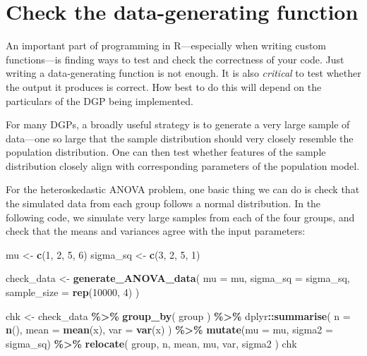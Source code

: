 \documentclass[
]{book}
\newenvironment{Shaded}{\begin{snugshade}}{\end{snugshade}}
\newcommand{\AttributeTok}[1]{\textcolor[rgb]{0.13,0.29,0.53}{#1}}
\newcommand{\DecValTok}[1]{\textcolor[rgb]{0.00,0.00,0.81}{#1}}
\newcommand{\FunctionTok}[1]{\textcolor[rgb]{0.13,0.29,0.53}{\textbf{#1}}}
\newcommand{\NormalTok}[1]{#1}
\newcommand{\OtherTok}[1]{\textcolor[rgb]{0.56,0.35,0.01}{#1}}
\newcommand{\SpecialCharTok}[1]{\textcolor[rgb]{0.81,0.36,0.00}{\textbf{#1}}}
\begin{document}
\section{Check the data-generating function}\label{check-the-data-generating-function}

An important part of programming in R---especially when writing custom functions---is finding ways to test and check the correctness of your code. Just writing a data-generating function is not enough. It is also \emph{critical} to test whether the output it produces is correct. How best to do this will depend on the particulars of the DGP being implemented.

For many DGPs, a broadly useful strategy is to generate a very large sample of data---one so large that the sample distribution should very closely resemble the population distribution.
One can then test whether features of the sample distribution closely align with corresponding parameters of the population model.

For the heteroskedastic ANOVA problem, one basic thing we can do is check that the simulated data from each group follows a normal distribution.
In the following code, we simulate very large samples from each of the four groups, and check that the means and variances agree with the input parameters:

\begin{Shaded}
\begin{Highlighting}[]
\NormalTok{mu }\OtherTok{\textless{}{-}} \FunctionTok{c}\NormalTok{(}\DecValTok{1}\NormalTok{, }\DecValTok{2}\NormalTok{, }\DecValTok{5}\NormalTok{, }\DecValTok{6}\NormalTok{)}
\NormalTok{sigma\_sq }\OtherTok{\textless{}{-}} \FunctionTok{c}\NormalTok{(}\DecValTok{3}\NormalTok{, }\DecValTok{2}\NormalTok{, }\DecValTok{5}\NormalTok{, }\DecValTok{1}\NormalTok{)}

\NormalTok{check\_data }\OtherTok{\textless{}{-}} \FunctionTok{generate\_ANOVA\_data}\NormalTok{( }
  \AttributeTok{mu =}\NormalTok{ mu, }
  \AttributeTok{sigma\_sq =}\NormalTok{ sigma\_sq,}
  \AttributeTok{sample\_size =} \FunctionTok{rep}\NormalTok{(}\DecValTok{10000}\NormalTok{, }\DecValTok{4}\NormalTok{) }
\NormalTok{)}

\NormalTok{chk }\OtherTok{\textless{}{-}} 
\NormalTok{  check\_data }\SpecialCharTok{\%\textgreater{}\%} 
  \FunctionTok{group\_by}\NormalTok{( group ) }\SpecialCharTok{\%\textgreater{}\%}
\NormalTok{  dplyr}\SpecialCharTok{::}\FunctionTok{summarise}\NormalTok{(}
    \AttributeTok{n =} \FunctionTok{n}\NormalTok{(),}
    \AttributeTok{mean =} \FunctionTok{mean}\NormalTok{(x),}
    \AttributeTok{var =} \FunctionTok{var}\NormalTok{(x)}
\NormalTok{  ) }\SpecialCharTok{\%\textgreater{}\%}
  \FunctionTok{mutate}\NormalTok{(}\AttributeTok{mu =}\NormalTok{ mu, }\AttributeTok{sigma2 =}\NormalTok{ sigma\_sq) }\SpecialCharTok{\%\textgreater{}\%} 
  \FunctionTok{relocate}\NormalTok{( group, n, mean, mu, var, sigma2 )}
\NormalTok{chk}
\end{Highlighting}
\end{Shaded}
\end{document}
